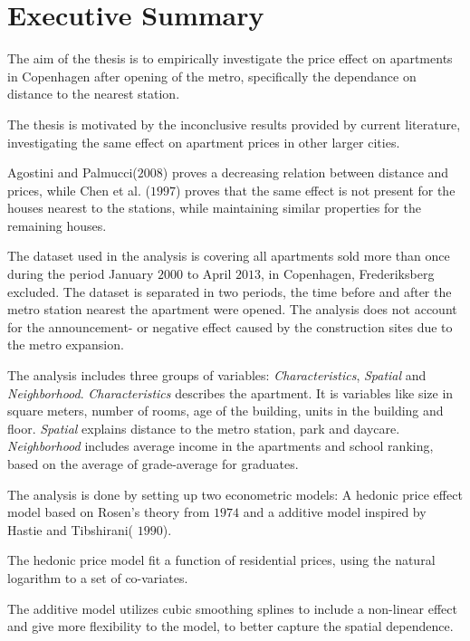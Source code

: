 \section{Executive Summary}
The aim of the thesis is to empirically investigate the price effect on 
apartments in Copenhagen after opening of the metro, specifically the dependance
on distance to the nearest station.

The thesis is motivated by the inconclusive results provided by current 
literature, investigating the same effect on apartment prices in other larger 
cities. 

Agostini and Palmucci($2008$) proves a decreasing relation between 
distance and prices, while Chen et al. ($1997$) proves that the same effect is 
not present for the houses nearest to the stations, while maintaining similar 
properties for the remaining houses.

The dataset used in the analysis is covering all apartments sold more than once 
during the period January $2000$ to April $2013$, in Copenhagen, Frederiksberg 
excluded. The dataset is separated in two periods, the time before and after the 
metro station nearest the apartment were opened. The analysis does not account 
for the announcement- or negative effect caused by the construction sites 
due to the metro expansion.  
 
The analysis includes three groups of variables: \textit{Characteristics}, 
\textit{Spatial} and \textit{Neighborhood}. \textit{Characteristics} describes the apartment. It is variables like size in 
square meters, number of rooms, age of the building, units in the building and 
floor. \textit{Spatial} explains distance to the metro station, park and 
daycare. \textit{Neighborhood} includes average income in the apartments 
and school ranking, based on the average of grade-average for graduates. 


The analysis is done by setting up two econometric models:  A 
hedonic price effect model based on Rosen's theory from $1974$ and a additive model 
inspired by Hastie and Tibshirani( $1990$). 

The hedonic price model fit a function of residential prices, using the natural 
logarithm to a set of co-variates. 

The additive model utilizes cubic smoothing splines to include a non-linear effect
and give more flexibility to the model, to better capture the spatial dependence. 

